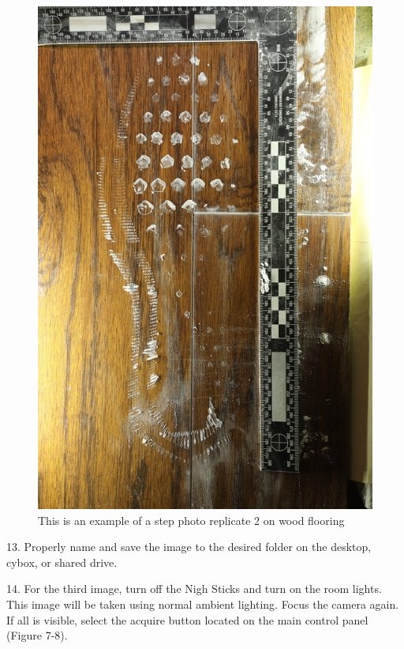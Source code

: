 \begin{figure}[!htp]
\centering
\includegraphics[scale=1.3]{Wood2.png}
\caption{This is an example of a step photo replicate 2 on wood flooring }
\label{Figure 7}
\end{figure}

\newpage

13. Properly name and save the image to the desired folder on the desktop, cybox, or shared drive.

14. For the third image, turn off the Nigh Sticks and turn on the room lights. This image will be taken using normal ambient lighting. Focus the camera again.  If all is visible, select the acquire button located on the main control panel (Figure 7-8).

